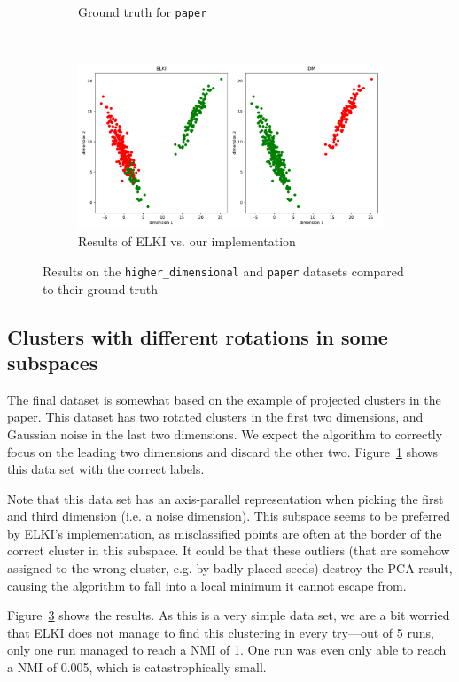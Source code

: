 \documentclass[english]{scrartcl}
\begin{document}
\begin{figure}[p]
\begin{subfigure}{0.6\textwidth}
        \caption{Ground truth for \texttt{paper}}
        \label{fig:true_paper}
    \end{subfigure}%
    \\
    \begin{subfigure}{0.6\textwidth}
        \includegraphics[width=\textwidth]{img/paper_cmp}
        \caption{Results of ELKI vs. our implementation}
        \label{fig:paper_results}
    \end{subfigure}
    \caption{Results on the \texttt{higher\_dimensional} and \texttt{paper} datasets compared to their ground truth}
\end{figure}

\subsection{Clusters with different rotations in some subspaces}

The final dataset is somewhat based on the example of projected clusters
in the paper. This dataset has two rotated clusters in the first two dimensions,
and Gaussian noise in the last two dimensions. We expect the algorithm to
correctly focus on the leading two dimensions and discard the other two.
Figure~\ref{fig:true_paper} shows this data set with the correct labels.

Note that this data set has an axis-parallel representation when picking the
first and third dimension (i.e. a noise dimension). This subspace seems to be
preferred by ELKI's implementation, as misclassified points are often at the
border of the correct cluster in this subspace. It could be that these outliers
(that are somehow assigned to the wrong cluster, e.g. by badly placed seeds)
destroy the PCA result, causing the algorithm to fall into a local minimum it
cannot escape from.

Figure~\ref{fig:paper_results} shows the results. As this is a very simple
data set, we are a bit worried that ELKI does not manage to find this
clustering in every try---out of 5 runs, only one run managed to reach a
NMI of 1. One run was even only able to reach a NMI of 0.005, which is
catastrophically small.
\end{document}
